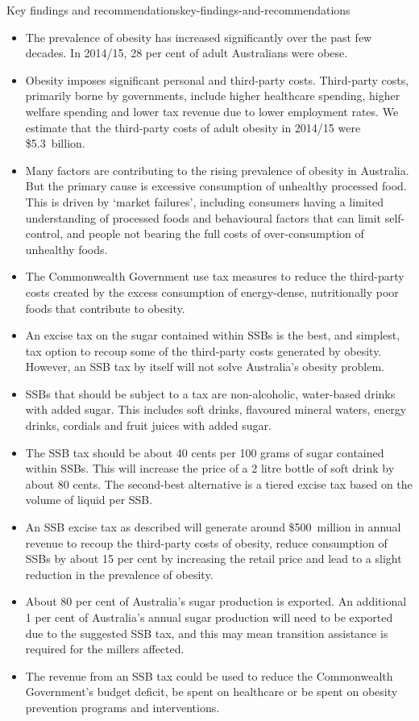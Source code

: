 \documentclass[embargoed]{grattan}
\begin{document}
\begin{bigbox*}{Key findings and recommendations}{key-findings-and-recommendations}

\begin{itemize}
\item
  The prevalence of obesity has increased significantly over the past few decades.
In 2014/15, 28 per cent of adult Australians were obese.
\item
  Obesity imposes significant personal and third-party costs.
Third-party costs, primarily borne by governments, include higher healthcare spending, higher welfare spending and lower tax revenue due to lower employment rates.
We estimate that the third-party costs of adult obesity in 2014/15 were \$5.3~billion.
\item
  Many factors are contributing to the rising prevalence of obesity in Australia.
But the primary cause is excessive consumption of unhealthy processed food.
This is driven by `market failures', including consumers having a limited understanding of processed foods and behavioural factors that can limit self-control, and people not bearing the full costs of over-consumption of unhealthy foods.
\item
  The Commonwealth Government use tax measures to reduce the third-party costs created by the excess consumption of energy-dense, nutritionally poor foods that contribute to obesity.
\item
  An excise tax on the sugar contained within SSBs is the best, and simplest, tax option to recoup some of the third-party costs generated by obesity.
However, an SSB tax by itself will not solve Australia's obesity problem.
\item
  SSBs that should be subject to a tax are non-alcoholic, water-based drinks with added sugar.
This includes soft drinks, flavoured mineral waters, energy drinks, cordials and fruit juices with added sugar.
\item
  The SSB tax should be about 40 cents per 100 grams of sugar contained within SSBs.
This will increase the price of a 2 litre bottle of soft drink by about 80 cents.
The second-best alternative is a tiered excise tax based on the volume of liquid per SSB.
\item
  An SSB excise tax as described will generate around \$500~million in annual revenue to recoup the third-party costs of obesity, reduce consumption of SSBs by about 15 per cent by increasing the retail price and lead to a slight reduction in the prevalence of obesity.
\item
   About 80 per cent of Australia's sugar production is exported.
An additional 1 per cent of Australia's annual sugar production will need to be exported due to the suggested SSB tax, and this may mean transition assistance is required for the millers affected.
\item
  The revenue from an SSB tax could be used to reduce the Commonwealth Government's budget deficit, be spent on healthcare or be spent on obesity prevention programs and interventions.
\end{itemize}
\end{bigbox*}
\end{document}

